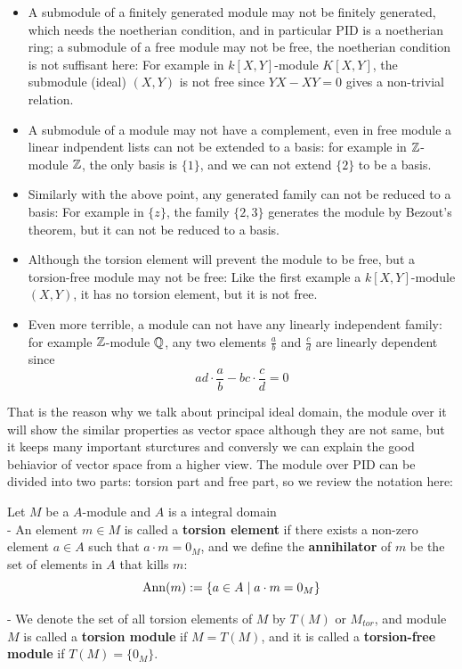 \begin{itemize} 
    \item A submodule of a finitely generated module may not be finitely generated, which needs the noetherian condition, and in particular PID is a noetherian ring; a submodule of a free module may not be free, the noetherian condition is not suffisant here: For example in \(k[X,Y]\)-module \(K[X,Y]\), the submodule (ideal) \((X,Y)\) is not free since \(YX-XY = 0\) gives a non-trivial relation.
    \item A submodule of a module may not have a complement, even in free module a linear indpendent lists can not be extended to a basis: for example in \(\mathbb{Z}\)-module \(\mathbb{Z}\), the only basis is \(\{1\}\), and we can not extend \(\{2\}\) to be a basis.
    \item Similarly with the above point, any generated family can not be reduced to a basis: For example in \(\{z\}\), the family \(\{2,3\}\) generates the module by Bezout's theorem, but it can not be reduced to a basis.
    \item Although the torsion element will prevent the module to be free, but a torsion-free module may not be free: Like the first example a \(k[X,Y]\)-module \((X,Y)\), it has no torsion element, but it is not free.
    
    \item Even more terrible, a module can not have any linearly independent family: for example \(\mathbb{Z}\)-module \(\mathbb{Q}\), any two elements \(\frac{a}{b}\) and \(\frac{c}{d}\) are linearly dependent since \[ad \cdot \frac{a}{b} - bc \cdot \frac{c}{d} = 0\]
\end{itemize}

That is the reason why we talk about principal ideal domain, the module over it will show the similar properties as vector space although they are not same, but it keeps many important sturctures and conversly we can explain the good behiavior of vector space from a higher view. The module over PID can be divided into two parts: torsion part and free part, so we review the notation here:

\begin{definition}
    Let \(M\) be a \(A\)-module and \(A\) is a integral domain\\
    
    - An element \(m \in M\) is called a \textbf{torsion element} if there exists a non-zero element \(a \in A\) such that \(a \cdot m = 0_M\), and we define the \textbf{annihilator} of \(m\) be the set of elements in \(A\) that kills \(m\):
    \[\operatorname{Ann}(m) := \{a \in A \mid a \cdot m = 0_M\}\]

    - We denote the set of all torsion elements of \(M\) by \(T(M)\) or \(M_{tor}\), and module \(M\) is called a \textbf{torsion module} if \(M = T(M)\), and it is called a \textbf{torsion-free module} if \(T(M) = \{0_M\}\).

\end{definition}

